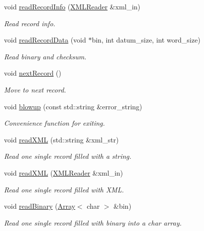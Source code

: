\begin{DoxyCompactItemize}
void \mbox{\hyperlink{group__qio_ga4d771a46d7db77cd0ae5999113733795}{read\+Record\+Info}} (\mbox{\hyperlink{classADATXML_1_1XMLReader}{X\+M\+L\+Reader}} \&xml\+\_\+in)
\begin{DoxyCompactList}\small\item\em Read record info. \end{DoxyCompactList}\item 
void \mbox{\hyperlink{group__qio_ga525c9902a7ee7ebe41c688897da0652e}{read\+Record\+Data}} (void $\ast$bin, int datum\+\_\+size, int word\+\_\+size)
\begin{DoxyCompactList}\small\item\em Read binary and checksum. \end{DoxyCompactList}\item 
void \mbox{\hyperlink{group__qio_ga032651053fa6b2de6d3977f15862c48e}{next\+Record}} ()
\begin{DoxyCompactList}\small\item\em Move to next record. \end{DoxyCompactList}\item 
void \mbox{\hyperlink{group__qio_gaddf83cb612ce869fe7a0a5f7e559fe72}{blowup}} (const std\+::string \&error\+\_\+string)
\begin{DoxyCompactList}\small\item\em Convenience function for exiting. \end{DoxyCompactList}\item 
void \mbox{\hyperlink{classADATIO_1_1ADATFileReader_gae57feac2bf53666ac092bb0a43125226}{read\+X\+ML}} (std\+::string \&xml\+\_\+str)
\begin{DoxyCompactList}\small\item\em Read one single record filled with a string. \end{DoxyCompactList}\item 
void \mbox{\hyperlink{classADATIO_1_1ADATFileReader_ga9a1ac411577bd50e643f483119318893}{read\+X\+ML}} (\mbox{\hyperlink{classADATXML_1_1XMLReader}{X\+M\+L\+Reader}} \&xml\+\_\+in)
\begin{DoxyCompactList}\small\item\em Read one single record filled with X\+ML. \end{DoxyCompactList}\item 
void \mbox{\hyperlink{classADATIO_1_1ADATFileReader_ga40b41bda2b27ce68a0ac0ee28124fc64}{read\+Binary}} (\mbox{\hyperlink{classXMLArray_1_1Array}{Array}}$<$ char $>$ \&bin)
\begin{DoxyCompactList}\small\item\em Read one single record filled with binary into a char array. \end{DoxyCompactList}\item 

\end{DoxyCompactItemize}
